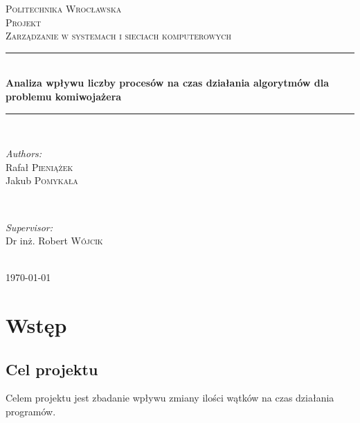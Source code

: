 \documentclass{article}
\begin{document}
	
	\begin{titlepage}
		\center
		\newcommand{\HRule}{\rule{\linewidth}{0.5mm}}
		
		\textsc{\LARGE Politechnika Wrocławska}\\[1.5cm]
		\textsc{\Large Projekt}\\[0.5cm] 
		\textsc{\large Zarządzanie w systemach i sieciach komputerowych}\\[0.5cm] 

		\HRule \\[0.4cm]
		{ \huge \bfseries Analiza wpływu liczby procesów na czas działania algorytmów dla problemu komiwojażera}\\[0.4cm]
		\HRule \\[1.5cm]
		
		\begin{minipage}{0.4\textwidth}
			\begin{flushleft} \large
				\emph{Authors:}\\
				Rafał \textsc{Pieniążek} 
				\\ Jakub \textsc{Pomykała}
			\end{flushleft}
		\end{minipage}
		~
		\begin{minipage}{0.4\textwidth}
			\begin{flushright} \large
				\emph{Supervisor:} \\
				Dr inż. Robert \textsc{Wójcik} 
			\end{flushright}
		\end{minipage}\\[4cm]

		{\large \today}\\[3cm]
		
		\vfill
		
	\end{titlepage}

\tableofcontents

\newpage
	
\listoffigures
\listoftables	
	
	
\section{Wstęp}
	\subsection{Cel projektu}
		Celem projektu jest zbadanie wpływu zmiany ilości wątków na czas działania programów.
\end{document}
